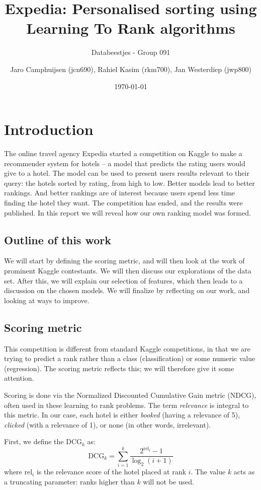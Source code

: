 \documentclass[runningheads,a4paper]{llncs}
\author{Jaro Camphuijsen (jcn690), Rahiel Kasim (rkm700), Jan Westerdiep (jwp800)}
\date{\today}
\title{Expedia: Personalised sorting using Learning To Rank algorithms}
\subtitle{Databeestjes - Group 091}
\begin{document}
\maketitle

\section{Introduction}
The online travel agency Expedia started a competition on Kaggle to make a 
recommender system for hotels -- a model that predicts the rating users would give 
to a hotel. The model can be used to present users results relevant to their 
query: the hotels sorted by rating, from high to low. Better models lead to 
better rankings. And better rankings are of interest because users spend less 
time finding the hotel they want. The competition has ended,\cite{kaggle:expedia} 
and the results were published. In this report we will reveal how our own ranking 
model was formed.

\subsection{Outline of this work}
We will start by defining the scoring metric, and will then look at the work of 
prominent Kaggle contestants. We will then discuss our explorations of the data 
set. After this, we will explain our selection of features, which then leads to 
a discussion on the chosen models. We will finalize by reflecting on our work, 
and looking at ways to improve.

\subsection{Scoring metric}
This competition is different from standard Kaggle competitions, in that we are 
trying to predict a rank rather than a class (classification) or some numeric 
value (regression). The scoring metric reflects this; we will therefore give it 
some attention.

Scoring is done via the Normalized Discounted Cumulative Gain metric (NDCG), often used 
in these learning to rank problems. The term \emph{relevance} is integral to this 
metric. In our case, each hotel is either \emph{booked} (having a relevance of 5), 
\emph{clicked} (with a relevance of 1), or none (in other words, irrelevant). 

First, we define the $\text{DCG}_k$ as:
\[
	\text{DCG}_k = \sum_{i=1}^k \frac{2^{\text{rel}_i} - 1}{\log_2(i+1)}
\]
where $\text{rel}_i$ is the relevance score of the hotel placed at rank $i$. The 
value $k$ acts as a truncating parameter: ranks higher than $k$ will not be used.
\end{document}
